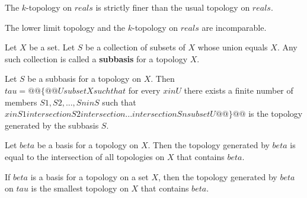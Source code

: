 \begin{prop}
    The $k$-topology on $reals$ is strictly finer than the usual topology on $reals$.
\end{prop}

\begin{prop}
    The lower limit topology and the $k$-topology on $reals$ are incomparable.
\end{prop}


\begin{defn}
    Let $X$ be a set. Let $S$ be a collection of subsets of $X$ whose union equals $X$. Any such collection is called a \textbf{subbasis} for a topology $X$.
\end{defn}

\begin{thm}
    Let $S$ be a subbasis for a topology on $X$. Then
    \\ $tau = @@\{@@ U subset X such that $ for every $ x in U $ there exists a finite number of members $ S1, S2, ..., Sn in S $ such that $ x in S1 intersection S2 intersection ... intersection Sn subset U @@\}@@$ is the topology generated by the subbasis $S$.
\end{thm}

\begin{thm}
    Let $beta$ be a basis for a topology on $X$. Then the topology generated by $beta$ is equal to the intersection of all topologies on $X$ that contains $beta$.
\end{thm}

\begin{thm}
    If $beta$ is a basis for a topology on a set $X$, then the topology generated by $beta$ on $tau$ is the smallest topology on $X$ that contains $beta$.
\end{thm}

\hhrule
